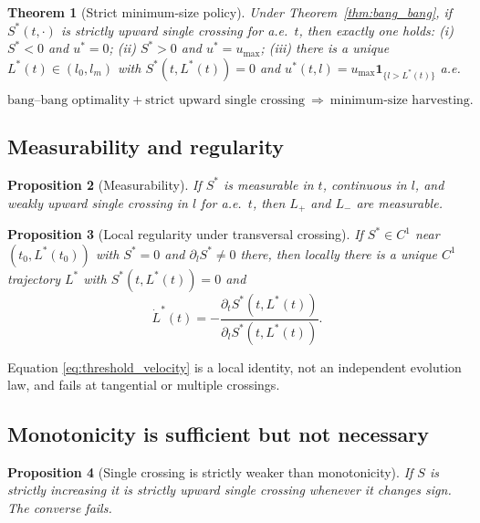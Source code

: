 \documentclass[pdflatex,sn-mathphys-num]{sn-jnl}
\theoremstyle{plain}
\newtheorem{theorem}{Theorem}[section]
\newtheorem{proposition}[theorem]{Proposition}
\theoremstyle{definition}
\theoremstyle{remark}
\begin{document}
\begin{theorem}[Strict minimum-size policy]
\label{thm:strict_threshold_structure}
Under Theorem~\ref{thm:bang_bang}, if $S^*(t,\cdot)$ is strictly upward single
crossing for a.e.\ $t$, then exactly one holds: (i) $S^*<0$ and $u^*=0$;
(ii) $S^*>0$ and $u^*=u_{\max}$; (iii) there is a unique $L^*(t)\in(l_0,l_m)$ with
$S^*(t,L^*(t))=0$ and
$\displaystyle u^*(t,l)=u_{\max}\mathbf 1_{\{l>L^*(t)\}}$ a.e.
\end{theorem}

\[
\text{bang--bang optimality}+\text{strict upward single crossing}
\ \Longrightarrow\ \text{minimum-size harvesting.}
\]

\subsection{Measurability and regularity}
\label{subsec:threshold_regularity}

\begin{proposition}[Measurability]
\label{prop:threshold_measurable}
If $S^*$ is measurable in $t$, continuous in $l$, and weakly upward single
crossing in $l$ for a.e.\ $t$, then $L_+$ and $L_-$ are measurable.
\end{proposition}

\begin{proposition}[Local regularity under transversal crossing]
\label{prop:threshold_regular}
If $S^*\in C^1$ near $(t_0,L^*(t_0))$ with $S^*=0$ and
$\partial_lS^*\neq0$ there, then locally there is a unique $C^1$ trajectory $L^*$
with $S^*(t,L^*(t))=0$ and
\begin{equation}\label{eq:threshold_velocity}
\dot L^*(t)=-\frac{\partial_tS^*(t,L^*(t))}{\partial_lS^*(t,L^*(t))}.
\end{equation}
\end{proposition}

Equation \eqref{eq:threshold_velocity} is a local identity, not an independent
evolution law, and fails at tangential or multiple crossings.

\subsection{Monotonicity is sufficient but not necessary}
\label{subsec:monotonicity_not_necessary}

\begin{proposition}[Single crossing is strictly weaker than monotonicity]
\label{prop:single_crossing_weaker}
If $S$ is strictly increasing it is strictly upward single crossing whenever it
changes sign. The converse fails.
\end{proposition}
\end{document}
